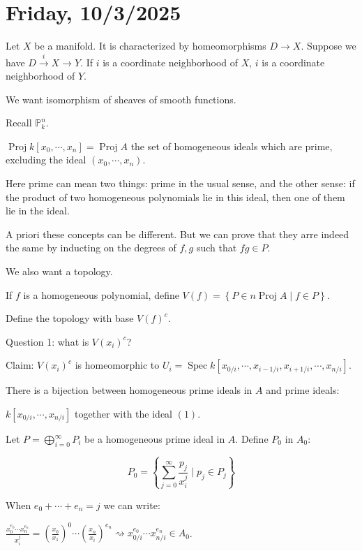 \documentclass{article}
\theoremstyle{definition}
\begin{document}
    \section*{Friday, 10/3/2025}
    
    Let \(X\) be a manifold. It is characterized by homeomorphisms \(D \to X\). Suppose we have \(D \xrightarrow{i} X \to Y\). If \(i\) is a coordinate neighborhood of \(X\), \(i\) is a coordinate neighborhood of \(Y\).

    We want isomorphism of sheaves of smooth functions.

    Recall \(\mathbb{P}^n_k\).
    
    \(\operatorname{Proj} k[x_0, \cdots , x_n] = \operatorname{Proj} A\) the set of homogeneous ideals which are prime, excluding the ideal \((x_0, \cdots , x_n)\).

    Here prime can mean two things: prime in the usual sense, and the other sense: if the product of two homogeneous polynomials lie in this ideal, then one of them lie in the ideal.

    A priori these concepts can be different. But we can prove that they arre indeed the same by inducting on the degrees of \(f,g\) such that \(fg\in P\).

    We also want a topology.

    If \(f\) is a homogeneous polynomial, define \(V(f) = \left\{ P \in n\operatorname{Proj} A \mid f\in P \right\}\).
    
    Define the topology with base \(V(f)^c\).

    Question 1: what is \(V(x_i)^{c}\)?

    Claim: \(V(x_i)^{c}\) is homeomorphic to \(U_i = \operatorname{Spec} k[x_{0 / i}, \cdots , x_{i-1 / i}, x_{i+1 / i}, \cdots , x_{n / i}]\).
    
    There is a bijection between homogeneous prime ideals in \(A\) and prime ideals:
    
    \(k[x_{0 / i}, \cdots , x_{n / i}]\) together with the ideal \((1)\).
    
    Let \(P = \bigoplus_{i=0}^{\infty} P_i\) be a homogeneous prime ideal in \(A\). Define \(P_0\) in \(A_0\):

    \[
        P_0 = \left\{ \sum_{j=0}^{\infty} \frac{p_j}{x_i^j} \mid p_j \in P_j \right\} 
    \]

    When \(e_0 + \cdots + e_n = j\) we can write:

    \(\frac{x_0^{e_0} \cdots x_n^{e_n}}{x_i^j} = \left( \frac{x_0}{x_1} \right)^0 \cdots \left( \frac{x_n}{x_i} \right)^{e_n} \rightsquigarrow x_{0 / i}^{e_0} \cdots x_{n / i}^{e_n} \in A_0\).
    
\end{document}

